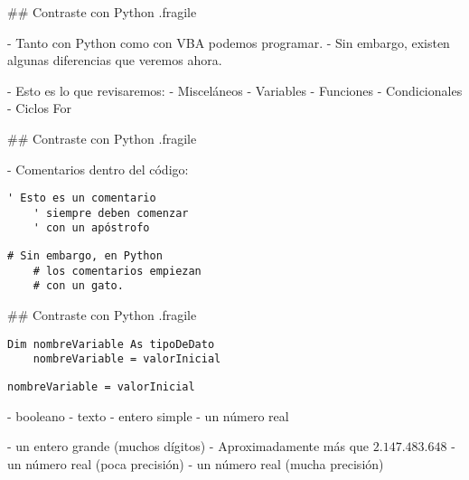 ## Contraste con Python {.fragile}

- Tanto con Python como con VBA podemos programar.
- Sin embargo, existen algunas diferencias que veremos ahora.

\pause

- Esto es lo que revisaremos:
    - Misceláneos
    - Variables
    - Funciones
    - Condicionales
    - Ciclos For

## Contraste con Python {.fragile}


- Comentarios dentro del código:

\bgncolumns

\centering {}
\begin{lstlisting}[style=vba]
    ' Esto es un comentario
    ' siempre deben comenzar
    ' con un apóstrofo
\end{lstlisting}

\centering {}
\begin{lstlisting}[style=frame03]
    # Sin embargo, en Python
    # los comentarios empiezan
    # con un gato.
\end{lstlisting}

\trmcolumns

## Contraste con Python {.fragile}


\bgncolumns

\centering {}
\begin{lstlisting}[style=vba]
    Dim nombreVariable As tipoDeDato
    nombreVariable = valorInicial
\end{lstlisting}

\centering {}
\begin{lstlisting}[style=frame03]
    nombreVariable = valorInicial
\end{lstlisting}

\trmcolumns

\vfill


-  booleano
-  texto
-  entero simple
-  un número real

\vfill

-  un entero grande (muchos dígitos)
    - Aproximadamente más que $2.147.483.648$
-  un número real (poca precisión)
-  un número real (mucha precisión)

